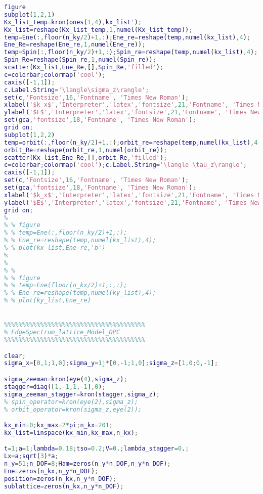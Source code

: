 \begin{lstlisting}[language=matlab]
figure
subplot(1,2,1)
Kx_list_temp=kron(ones(1,4),kx_list');
Kx_list=reshape(Kx_list_temp,1,numel(Kx_list_temp));
temp=Ene(:,floor(n_ky/2)+1,:);Ene_re=reshape(temp,numel(kx_list),4);
Ene_Re=reshape(Ene_re,1,numel(Ene_re));
temp=Spin(:,floor(n_ky/2)+1,:);Spin_re=reshape(temp,numel(kx_list),4);
Spin_Re=reshape(Spin_re,1,numel(Spin_re));
scatter(Kx_list,Ene_Re,[],Spin_Re,'filled');
c=colorbar;colormap('cool');
caxis([-1,1]);
c.Label.String='\langle\sigma_z\rangle';
set(c,'Fontsize',16,'Fontname', 'Times New Roman');
xlabel('$k_x$','Interpreter','latex','fontsize',21,'Fontname', 'Times New Roman');
ylabel('$E$','Interpreter','latex','fontsize',21,'Fontname', 'Times New Roman');
set(gca,'fontsize',18,'Fontname', 'Times New Roman');
grid on;
subplot(1,2,2)
temp=orbit(:,floor(n_ky/2)+1,:);orbit_re=reshape(temp,numel(kx_list),4);
orbit_Re=reshape(orbit_re,1,numel(orbit_re));
scatter(Kx_list,Ene_Re,[],orbit_Re,'filled');
c=colorbar;colormap('cool');c.Label.String='\langle \tau_z\rangle';
caxis([-1,1]);
set(c,'Fontsize',16,'Fontname', 'Times New Roman');
set(gca,'fontsize',18,'Fontname', 'Times New Roman');
xlabel('$k_x$','Interpreter','latex','fontsize',21,'Fontname', 'Times New Roman');
ylabel('$E$','Interpreter','latex','fontsize',21,'Fontname', 'Times New Roman');
grid on;
%
% % figure
% % temp=Ene(:,floor(n_ky/2)+1,:);
% % Ene_re=reshape(temp,numel(kx_list),4);
% % plot(kx_list,Ene_re,'b')
%
%
% %
% % figure
% % temp=Ene(floor(n_kx/2)+1,:,:);
% % Ene_re=reshape(temp,numel(ky_list),4);
% % plot(ky_list,Ene_re)


%%%%%%%%%%%%%%%%%%%%%%%%%%%%%%%%%%%%%%%
% EdgeSpectrum_lattice_Model_OPC
%%%%%%%%%%%%%%%%%%%%%%%%%%%%%%%%%%%%%%%

clear;
sigma_x=[0,1;1,0];sigma_y=1j*[0,-1;1,0];sigma_z=[1,0;0,-1];

sigma_zeeman=kron(eye(4),sigma_z);
stagger=diag([1,-1,1,-1],0);
sigma_zeeman_stagger=kron(stagger,sigma_z);
% spin_operator=kron(eye(2),sigma_z);
% orbit_operator=kron(sigma_z,eye(2));

kx_min=0;kx_max=2*pi;n_kx=201;
kx_list=linspace(kx_min,kx_max,n_kx);

t=1;a=1;lambda=0.18;tso=0.2;V=0.;lambda_stagger=0.;
Lx=a;sqrt(3)*a;
n_y=51;n_DOF=8;Ham=zeros(n_y*n_DOF,n_y*n_DOF);
Ene=zeros(n_kx,n_y*n_DOF);
position=zeros(n_kx,n_y*n_DOF);
sublattice=zeros(n_kx,n_y*n_DOF);


\end{lstlisting}
